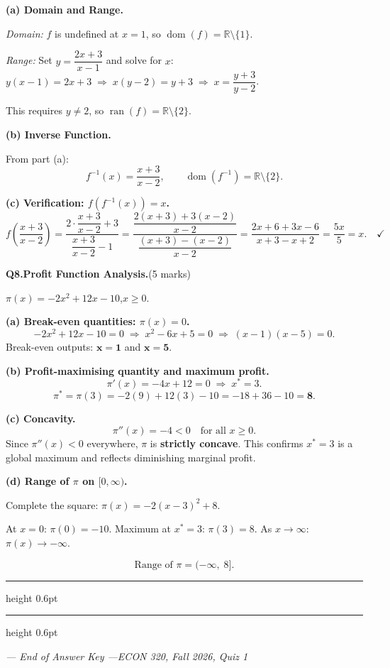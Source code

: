 \documentclass[11pt]{article}
\begin{document}
\begin{solutionbox}
\textbf{(a) Domain and Range.}

\textit{Domain:} $f$ is undefined at $x = 1$, so $\operatorname{dom}(f) = \mathbb{R} \setminus \{1\}$.

\textit{Range:} Set $y = \dfrac{2x+3}{x-1}$ and solve for $x$:
$y(x-1) = 2x+3 \;\Rightarrow\; x(y-2) = y+3 \;\Rightarrow\; x = \dfrac{y+3}{y-2}$.

This requires $y \neq 2$, so $\operatorname{ran}(f) = \mathbb{R} \setminus \{2\}$.

\medskip
\textbf{(b) Inverse Function.}

From part (a):
\[
  f^{-1}(x) = \frac{x+3}{x-2}, \qquad \operatorname{dom}(f^{-1}) = \mathbb{R} \setminus \{2\}.
\]

\medskip
\textbf{(c) Verification: $f(f^{-1}(x)) = x$.}
\[
  f\!\left(\frac{x+3}{x-2}\right)
  = \frac{2\cdot\dfrac{x+3}{x-2}+3}{\dfrac{x+3}{x-2}-1}
  = \frac{\dfrac{2(x+3)+3(x-2)}{x-2}}{\dfrac{(x+3)-(x-2)}{x-2}}
  = \frac{2x+6+3x-6}{x+3-x+2}
  = \frac{5x}{5} = x. \quad\checkmark
\]
\end{solutionbox}



\newpage

\noindent\textbf{Q8.}\quad\textbf{Profit Function Analysis.}\quad(5 marks)

\medskip
\begin{databox}
\small $\pi(x) = -2x^2 + 12x - 10$,\quad $x \geq 0$.
\end{databox}

\medskip

\begin{solutionbox}
\textbf{(a) Break-even quantities: $\pi(x) = 0$.}
\[
  -2x^2 + 12x - 10 = 0
  \;\Rightarrow\; x^2 - 6x + 5 = 0
  \;\Rightarrow\; (x-1)(x-5) = 0.
\]
Break-even outputs: $\mathbf{x = 1}$ and $\mathbf{x = 5}$.

\medskip
\textbf{(b) Profit-maximising quantity and maximum profit.}
\[
  \pi'(x) = -4x + 12 = 0 \;\Rightarrow\; x^* = 3.
\]
\[
  \pi^* = \pi(3) = -2(9) + 12(3) - 10 = -18 + 36 - 10 = \mathbf{8}.
\]

\medskip
\textbf{(c) Concavity.}
\[
  \pi''(x) = -4 < 0 \quad\text{for all } x \geq 0.
\]
Since $\pi''(x) < 0$ everywhere, $\pi$ is \textbf{strictly concave}.
This confirms $x^* = 3$ is a global maximum and reflects diminishing marginal profit.

\medskip
\textbf{(d) Range of $\pi$ on $[0,\infty)$.}

Complete the square: $\pi(x) = -2(x-3)^2 + 8$.

At $x = 0$: $\pi(0) = -10$. Maximum at $x^* = 3$: $\pi(3) = 8$. As $x \to \infty$: $\pi(x) \to -\infty$.

\[\text{Range of } \pi = (-\infty,\; 8].\]
\end{solutionbox}



\vspace{1em}
{\color{UNBCGold}\hrule height 0.6pt}



\vspace{1em}
{\color{UNBCGold}\hrule height 0.6pt}
\begin{center}
\small\itshape
--- End of Answer Key ---\quad ECON 320, Fall 2026, Quiz 1
\end{center}
\end{document}
